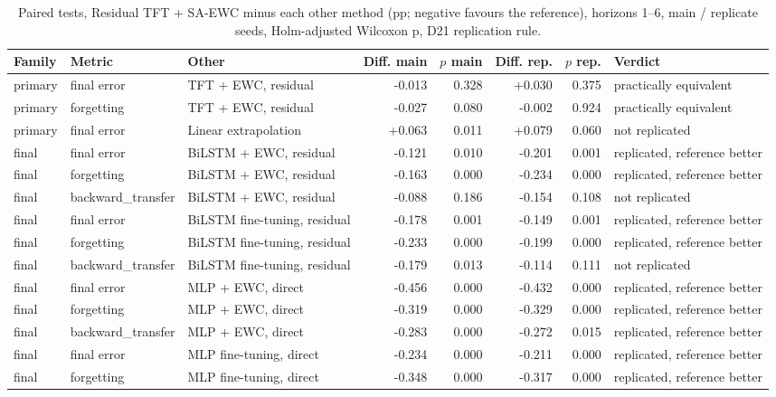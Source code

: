 \begin{table}[t]
  \centering
  \caption{Paired tests, Residual TFT + SA-EWC minus each other method (pp; negative favours the reference), horizons 1--6, main / replicate seeds, Holm-adjusted Wilcoxon p, D21 replication rule.}
  \label{tab:d24-tests-e2}
  \setlength{\tabcolsep}{3pt}
  \scriptsize
  \begin{tabular}{lllrrrrl}
    \toprule
    Family & Metric & Other & Diff. main & $p$ main & Diff. rep. & $p$ rep. & Verdict \\
    \midrule
    primary & final error & TFT + EWC, residual & -0.013 & 0.328 & +0.030 & 0.375 & practically equivalent \\
    primary & forgetting & TFT + EWC, residual & -0.027 & 0.080 & -0.002 & 0.924 & practically equivalent \\
    primary & final error & Linear extrapolation & +0.063 & 0.011 & +0.079 & 0.060 & not replicated \\
    final & final error & BiLSTM + EWC, residual & -0.121 & 0.010 & -0.201 & 0.001 & replicated, reference better \\
    final & forgetting & BiLSTM + EWC, residual & -0.163 & 0.000 & -0.234 & 0.000 & replicated, reference better \\
    final & backward\_transfer & BiLSTM + EWC, residual & -0.088 & 0.186 & -0.154 & 0.108 & not replicated \\
    final & final error & BiLSTM fine-tuning, residual & -0.178 & 0.001 & -0.149 & 0.001 & replicated, reference better \\
    final & forgetting & BiLSTM fine-tuning, residual & -0.233 & 0.000 & -0.199 & 0.000 & replicated, reference better \\
    final & backward\_transfer & BiLSTM fine-tuning, residual & -0.179 & 0.013 & -0.114 & 0.111 & not replicated \\
    final & final error & MLP + EWC, direct & -0.456 & 0.000 & -0.432 & 0.000 & replicated, reference better \\
    final & forgetting & MLP + EWC, direct & -0.319 & 0.000 & -0.329 & 0.000 & replicated, reference better \\
    final & backward\_transfer & MLP + EWC, direct & -0.283 & 0.000 & -0.272 & 0.015 & replicated, reference better \\
    final & final error & MLP fine-tuning, direct & -0.234 & 0.000 & -0.211 & 0.000 & replicated, reference better \\
    final & forgetting & MLP fine-tuning, direct & -0.348 & 0.000 & -0.317 & 0.000 & replicated, reference better \\

\end{tabular}
\end{table}
